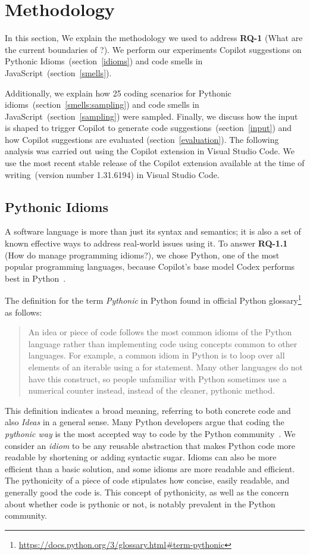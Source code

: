 \section{Methodology}
\label{methodology}
In this section, We explain the methodology we used to address \textbf{RQ-1} (What are the current boundaries of \cct{}?). We perform our experiments Copilot suggestions on Pythonic Idioms~(section~\ref{idioms}) and code smells in JavaScript~(section~\ref{smells}).

Additionally, we explain how 25 coding scenarios for Pythonic idioms~(section~\ref{smells:sampling}) and code smells in JavaScript~(section~\ref{sampling}) were sampled.
Finally, we discuss how the input is shaped to trigger Copilot to generate code suggestions~(section~\ref{input}) and how Copilot suggestions are evaluated (section~\ref{evaluation}).
The following analysis was carried out using the Copilot extension in Visual Studio Code. We use the most recent stable release of the Copilot extension available at the time of writing~(version number 1.31.6194) in Visual Studio Code.

\subsection{Pythonic Idioms}
\label{python}
A software language is more than just its syntax and semantics; it is also a set of known effective ways to address real-world issues using it. 
To answer \textbf{RQ-1.1} (How do \cct{} manage programming idioms?),
we chose Python, one of the most popular programming languages, because Copilot's base model Codex performs best in Python~\cite{copilot}.  

The definition for the term \emph{Pythonic} in Python found in official Python glossary\footnote{\url{https://docs.python.org/3/glossary.html\#term-pythonic}} as follows:

\begin{quote}
    An idea or piece of code follows the most common idioms of the Python language rather than implementing code using concepts common to other languages. For example, a common idiom in Python is to loop over all elements of an iterable using a for statement. Many other languages do not have this construct, so people unfamiliar with Python sometimes use a numerical counter instead, instead of the cleaner, pythonic method.
\end{quote}

This definition indicates a broad meaning, referring to both concrete code and also \emph{Ideas} in a general sense. Many Python developers argue that coding the \emph{pythonic way} is the most accepted way to code by the Python community~\cite{Alexandru2018}. 
We consider an \emph{idiom} to be any reusable abstraction that makes Python code more readable by shortening or adding syntactic sugar. Idioms can also be more efficient than a basic solution, and some idioms are more readable and efficient.
The pythonicity of a piece of code stipulates how concise, easily readable, and generally good the code is. This concept of pythonicity, as well as the concern about whether code is pythonic or not, is notably prevalent in the Python community.

